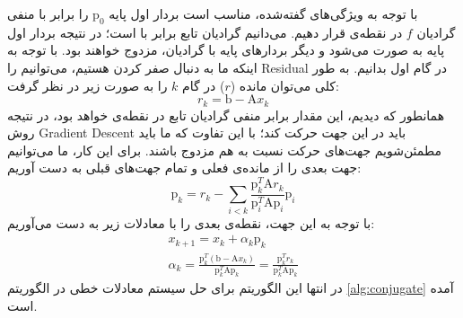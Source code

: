 با توجه به ویژگی‌های گفته‌شده، مناسب است بردار اول پایه
 $\textrm{p}_0$ 
 را برابر با منفی گرادیان $f$ در نقطه‌ی  قرار دهیم. می‌دانیم گرادیان تابع برابر با  است؛ در نتیجه بردار اول پایه به صورت  می‌شود و دیگر بردار‌های پایه با گرادیان، مزدوج خواهند بود. با توجه به اینکه ما به دنبال صفر کردن  هستیم، می‌توانیم  را \gls{Residual}‌ در گام اول بدانیم. به طور کلی می‌توان مانده ($r$) در گام $k$ را به صورت زیر در نظر گرفت:
 \begin{equation}
 	r_k = \textrm{b} - \textrm{A}x_k
 \end{equation}
همانطور که دیدیم، این مقدار برابر منفی گرادیان تابع در نقطه‌ی  خواهد بود، در نتیجه روش \gls{Gradient Descent} باید در این جهت حرکت کند؛ با این تفاوت که ما باید مطمئن‌شویم جهت‌های حرکت نسبت به هم مزدوج باشند. برای این کار، ما می‌توانیم جهت بعدی را از مانده‌ی فعلی و تمام جهت‌های قبلی به دست آوریم:
 \begin{equation}
	\textrm{p}_k = r_k - \sum_{i<k} \frac{\textrm{p}_k^T \textrm{A} r_k}{\textrm{p}_i^T \textrm{A} \textrm{p}_i} \textrm{p}_i
\end{equation}
با توجه به این جهت، نقطه‌ی بعدی را با معادلات زیر به دست می‌آوریم:
\begin{gather}
	x_{k+1} = x_k + \alpha_k \textrm{p}_k\\
	\alpha_k = \frac{\textrm{p}_k^T (\textrm{b} - \textrm{A} x_k)}{\textrm{p}_k^T \textrm{A} \textrm{p}_k} = \frac{\textrm{p}_k^T r_k}{\textrm{p}_k^T \textrm{A} \textrm{p}_k}
\end{gather}
در انتها این الگوریتم برای حل سیستم معادلات خطی در الگوریتم \ref{alg:conjugate} آمده است.
